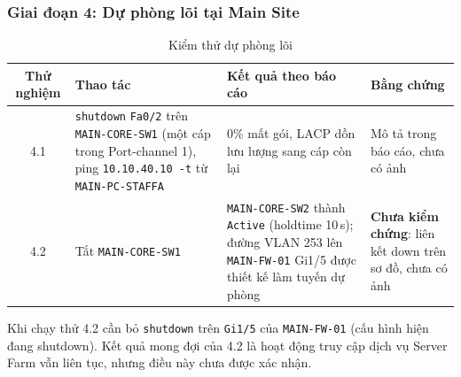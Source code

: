 
\subsubsection{Giai đoạn 4: Dự phòng lõi tại Main Site}
\begin{small}
\setlength{\tabcolsep}{4pt}
\begin{longtable}{|c|p{5.0cm}|p{4.6cm}|p{2.4cm}|}
\caption{Kiểm thử dự phòng lõi} \label{tab:core_ha} \\
\hline
\textbf{Thử nghiệm} & \textbf{Thao tác} & \textbf{Kết quả theo báo cáo} & \textbf{Bằng chứng} \\ \hline
\endhead
4.1 & \texttt{shutdown} \texttt{Fa0/2} trên \texttt{MAIN-CORE-SW1} (một cáp trong Port-channel 1), ping \texttt{10.10.40.10 -t} từ \texttt{MAIN-PC-STAFFA} & 0\% mất gói, LACP dồn lưu lượng sang cáp còn lại & Mô tả trong báo cáo, chưa có ảnh \\ \hline
4.2 & Tắt \texttt{MAIN-CORE-SW1} & \texttt{MAIN-CORE-SW2} thành \texttt{Active} (holdtime 10\,s); đường VLAN 253 lên \texttt{MAIN-FW-01} Gi1/5 được thiết kế làm tuyến dự phòng & \textbf{Chưa kiểm chứng}: liên kết down trên sơ đồ, chưa có ảnh \\ \hline
\end{longtable}
\end{small}
\noindent Khi chạy thử 4.2 cần bỏ \texttt{shutdown} trên \texttt{Gi1/5} của \texttt{MAIN-FW-01} (cấu hình hiện đang shutdown). Kết quả mong đợi của 4.2 là hoạt động truy cập dịch vụ Server Farm vẫn liên tục, nhưng điều này chưa được xác nhận.

